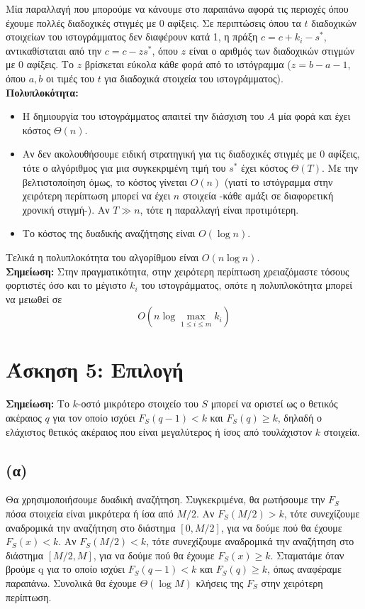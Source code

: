 		Μία παραλλαγή που μπορούμε να κάνουμε στο παραπάνω αφορά τις περιοχές όπου έχουμε πολλές διαδοχικές στιγμές με 0 αφίξεις. Σε περιπτώσεις όπου τα $t$ διαδοχικών στοιχείων του ιστογράμματος δεν διαφέρουν κατά 1, η πράξη $c = c + k_i - s^*$, αντικαθίσταται από την $c = c - zs^*$, όπου $z$ είναι ο αριθμός των διαδοχικών στιγμών με 0 αφίξεις. Το $z$ βρίσκεται εύκολα κάθε φορά από το ιστόγραμμα ($z = b - a - 1$, όπου $a, b$ οι τιμές του $t$ για διαδοχικά στοιχεία του ιστογράμματος).\\
		
		\textbf{Πολυπλοκότητα:} 
		
		\begin{itemize}
			\item Η δημιουργία του ιστογράμματος απαιτεί την διάσχιση του $Α$ μία φορά και έχει κόστος $Θ(n)$.
			\item Αν δεν ακολουθήσουμε ειδική στρατηγική για τις διαδοχικές στιγμές με 0 αφίξεις, τότε ο αλγόριθμος για μια συγκεκριμένη τιμή του $s^*$ έχει κόστος $Θ(T)$. Με την βελτιστοποίηση όμως, το κόστος γίνεται $O(n)$ (γιατί το ιστόγραμμα στην χειρότερη περίπτωση μπορεί να έχει $n$ στοιχεία -κάθε αμάξι σε διαφορετική χρονική στιγμή-). Αν $T \gg n$, τότε η παραλλαγή είναι προτιμότερη. 
			\item Το κόστος της δυαδικής αναζήτησης είναι $Ο(\log n)$.
		\end{itemize} 		
	
		Τελικά η πολυπλοκότητα του αλγορίθμου είναι $O(n \log n)$. \\
		
		\textbf{Σημείωση:} Στην πραγματικότητα, στην χειρότερη περίπτωση χρειαζόμαστε τόσους φορτιστές όσο και το μέγιστο $k_i$ του ιστογράμματος, οπότε η πολυπλοκότητα μπορεί να μειωθεί σε \[O(n \log \max_{1\leq i \leq m}k_i)\]
		
	\section*{Άσκηση 5: Επιλογή}
	
		\textbf{Σημείωση:} Το $k$-οστό μικρότερο στοιχείο του $S$ μπορεί να οριστεί ως ο θετικός ακέραιος $q$ για τον οποίο ισχύει $F_S(q-1) < k$ και $F_S(q) \geq k$, δηλαδή ο ελάχιστος θετικός ακέραιος που είναι μεγαλύτερος ή ίσος από τουλάχιστον $k$ στοιχεία.  
		
		\subsection*{(α)}
			Θα χρησιμοποιήσουμε δυαδική αναζήτηση. Συγκεκριμένα, θα ρωτήσουμε την $F_S$ πόσα στοιχεία είναι μικρότερα ή ίσα από $M/2$. Αν $F_S(M/2) > k$, τότε συνεχίζουμε αναδρομικά την αναζήτηση στο διάστημα $[0, Μ/2]$, για να δούμε πού θα έχουμε $F_S(x) < k$.  Αν $F_S(M/2) < k$, τότε συνεχίζουμε αναδρομικά την αναζήτηση στο διάστημα $[M/2, M]$, για να δούμε πού θα έχουμε $F_S(x) \geq k$. Σταματάμε όταν βρούμε q για το οποίο ισχύει $F_S(q-1) < k$ και $F_S(q) \geq k$, όπως αναφέραμε παραπάνω. Συνολικά θα έχουμε $Θ(\log M)$ κλήσεις της $F_S$ στην χειρότερη περίπτωση. 
		
